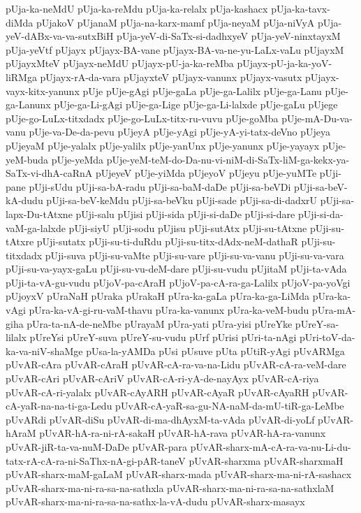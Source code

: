 {pUja-ka-neMdU
pUja-ka-reMdu
pUja-ka-relalx
pUja-kashacx
pUja-ka-tavx-diMda
pUjakoV
pUjanaM
pUja-na-karx-mamf
pUja-neyaM
pUja-niVyA
pUja-yeV-dABx-va-va-sutxBiH
pUja-yeV-di-SaTx-si-dadhxyeV
pUja-yeV-ninxtayxM
pUja-yeVtf
pUjayx
pUjayx-BA-vane
pUjayx-BA-va-ne-yu-LaLx-vaLu
pUjayxM
pUjayxMteV
pUjayx-neMdU
pUjayx-pU-ja-ka-reMba
pUjayx-pU-ja-ka-yoV-liRMga
pUjayx-rA-da-vara
pUjayxteV
pUjayx-vanunx
pUjayx-vasutx
pUjayx-vayx-kitx-yanunx
pUje
pUje-gAgi
pUje-gaLa
pUje-ga-Lalilx
pUje-ga-Lanu
pUje-ga-Lanunx
pUje-ga-Li-gAgi
pUje-ga-Lige
pUje-ga-Li-lalxde
pUje-gaLu
pUjege
pUje-go-LuLx-titxdadx
pUje-go-LuLx-titx-ru-vuvu
pUje-goMba
pUje-mA-Du-va-vanu
pUje-va-De-da-pevu
pUjeyA
pUje-yAgi
pUje-yA-yi-tatx-deVno
pUjeya
pUjeyaM
pUje-yalalx
pUje-yalilx
pUje-yanUnx
pUje-yanunx
pUje-yayayx
pUje-yeM-buda
pUje-yeMda
pUje-yeM-teM-do-Da-nu-vi-niM-di-SaTx-liM-ga-kekx-ya-SaTx-vi-dhA-caRnA
pUjeyeV
pUje-yiMda
pUjeyoV
pUjeyu
pUje-yuMTe
pUji-pane
pUji-sUdu
pUji-sa-bA-radu
pUji-sa-baM-daDe
pUji-sa-beVDi
pUji-sa-beV-kA-dudu
pUji-sa-beV-keMdu
pUji-sa-beVku
pUji-sade
pUji-sa-di-dadxrU
pUji-sa-lapx-Du-tAtxne
pUji-salu
pUjisi
pUji-sida
pUji-si-daDe
pUji-si-dare
pUji-si-da-vaM-ga-lalxde
pUji-siyU
pUji-sodu
pUjisu
pUji-sutAtx
pUji-su-tAtxne
pUji-su-tAtxre
pUji-sutatx
pUji-su-ti-duRdu
pUji-su-titx-dAdx-neM-dathaR
pUji-su-titxdadx
pUji-suva
pUji-su-vaMte
pUji-su-vare
pUji-su-va-vanu
pUji-su-va-vara
pUji-su-va-yayx-gaLu
pUji-su-vu-deM-dare
pUji-su-vudu
pUjitaM
pUji-ta-vAda
pUji-ta-vA-gu-vudu
pUjoV-pa-cAraH
pUjoV-pa-cA-ra-ga-Lalilx
pUjoV-pa-yoVgi
pUjoyxV
pUraNaH
pUraka
pUrakaH
pUra-ka-gaLa
pUra-ka-ga-LiMda
pUra-ka-vAgi
pUra-ka-vA-gi-ru-vaM-thavu
pUra-ka-vanunx
pUra-ka-veM-budu
pUra-mA-giha
pUra-ta-nA-de-neMbe
pUrayaM
pUra-yati
pUra-yisi
pUreYke
pUreY-sa-lilalx
pUreYsi
pUreY-suva
pUreY-su-vudu
pUrf
pUrisi
pUri-ta-nAgi
pUri-toV-da-ka-va-niV-shaMge
pUsa-la-yAMDa
pUsi
pUsuve
pUta
pUtiR-yAgi
pUvARMga
pUvAR-cAra
pUvAR-cAraH
pUvAR-cA-ra-va-na-Lidu
pUvAR-cA-ra-veM-dare
pUvAR-cAri
pUvAR-cAriV
pUvAR-cA-ri-yA-de-nayAyx
pUvAR-cA-riya
pUvAR-cA-ri-yalalx
pUvAR-cAyARH
pUvAR-cAyaR
pUvAR-cAyaRH
pUvAR-cA-yaR-na-na-ti-ga-Ledu
pUvAR-cA-yaR-sa-gu-NA-naM-da-mU-tiR-ga-LeMbe
pUvARdi
pUvAR-diSu
pUvAR-di-ma-dhAyxM-ta-vAda
pUvAR-di-yoLf
pUvAR-hAraM
pUvAR-hA-ra-ni-rA-sakaH
pUvAR-hA-rava
pUvAR-hA-ra-vanunx
pUvAR-jiR-ta-va-nuM-DaDe
pUvAR-para
pUvAR-sharx-mA-cA-ra-va-nu-Li-du-tatx-rA-cA-ra-ni-SaThx-nA-gi-pAR-taneV
pUvAR-sharxma
pUvAR-sharxmaH
pUvAR-sharx-maM-gaLaM
pUvAR-sharx-mada
pUvAR-sharx-ma-ni-rA-sashacx
pUvAR-sharx-ma-ni-ra-sa-na-sathxla
pUvAR-sharx-ma-ni-ra-sa-na-sathxlaM
pUvAR-sharx-ma-ni-ra-sa-na-sathx-la-vA-dudu
pUvAR-sharx-masayx
}

